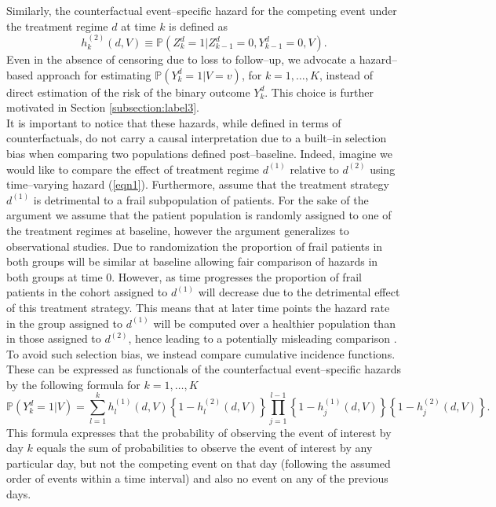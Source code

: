 \documentclass[12pt]{article}
\begin{document}
Similarly, the counterfactual event--specific hazard for the competing event under the treatment regime $d$ at time $k$ is defined as
\begin{equation}
\label{eqn2}
h_{k}^{(2)} \left(d, V \right) \equiv \mathbb{P} \left( Z_{k}^d = 1 \vert Z_{k-1}^d = 0, Y_{k-1}^d = 0, V \right).
\end{equation}
Even in the absence of censoring due to loss to follow--up, we advocate a hazard--based approach for estimating $\mathbb{P} \left( Y^d_k = 1 \vert V = v \right)$, for $k = 1, \dots, K$, instead of direct estimation of the risk of the binary outcome $Y^d_k$. This choice is further motivated in Section \ref{subsection:label3}. 
\\
\indent
It is important to notice that these hazards, while defined in terms of counterfactuals, do not carry a causal interpretation due to a built--in selection bias when comparing two populations defined post--baseline. Indeed, imagine we would like to compare the effect of treatment regime $d^{(1)}$ relative to $d^{(2)}$ using time--varying hazard (\ref{eqn1}). Furthermore, assume that the treatment strategy $d^{(1)}$ is detrimental to a frail subpopulation of patients. For the sake of the argument we assume that the patient population is randomly assigned to one of the treatment regimes at baseline, however the argument generalizes to observational studies. Due to randomization the proportion of frail patients in both groups will be similar at baseline allowing fair comparison of hazards in both groups at time 0. However, as time progresses the proportion of frail patients in the cohort assigned to $d^{(1)}$ will decrease due to the detrimental effect of this treatment strategy. This means that at later time points the hazard rate in the group assigned to $d^{(1)}$ will be computed over a healthier population than in those assigned to $d^{(2)}$, hence leading to a potentially misleading comparison \citep{Hernan2010, Martinussen2018, Young2020}. 
\\
\indent
To avoid such selection bias, we instead compare cumulative incidence functions. These can be expressed as functionals of the counterfactual event--specific hazards by the following formula for $k=1,\dots,K$ \citep{Young2020}
\begin{equation}
\label{eqn3}
\mathbb{P} \left( Y_k^d = 1 \vert V \right) = \sum_{l=1}^{k} h_l^{(1)} \left(d, V \right) \left\lbrace 1 - h_l^{(2)} \left(d, V \right) \right\rbrace \prod_{j=1}^{l-1} \left\lbrace 1-h_j^{(1)} \left(d, V \right) \right\rbrace \left\lbrace 1-h_j^{(2)} \left(d, V \right) \right\rbrace.
\end{equation}
This formula expresses that the probability of observing the event of interest by day $k$ equals the sum of probabilities to observe the event of interest by any particular day, but not the competing event on that day (following the assumed order of events within a time interval) and also no event on any of the previous days. 
\end{document}
